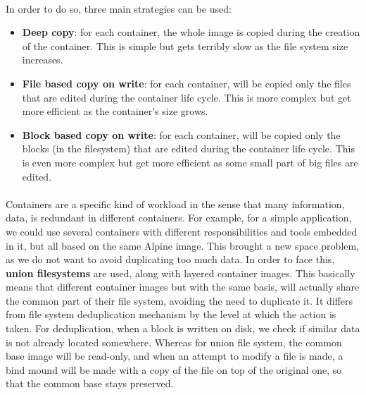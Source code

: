 \paragraph{}In order to do so, three main strategies can be used:
\begin{itemize}
\renewcommand\labelitemi{--}
  \item \textbf{Deep copy}: for each container, the whole image is copied during the creation of the container.  This is simple but gets terribly slow as the file system size increases.
  \item \textbf{File based copy on write}: for each container, will be copied only the files that are edited during the container life cycle.  This is more complex but get more efficient as the container's size grows.
  \item \textbf{Block based copy on write}: for each container, will be copied only the blocks (in the filesystem) that are edited during the container life cycle.  This is even more complex but get more efficient as some small part of big files are edited.
\end{itemize}

\paragraph{}Containers are a specific kind of workload in the sense that many information, data, is redundant in different containers.  For example, for a simple application, we could use several containers with different responsibilities and tools embedded in it, but all based on the same Alpine image.  This brought a new space problem, as we do not want to avoid duplicating too much data.  In order to face this, \textbf{union filesystems} are used, along with layered container images.  This basically means that different container images but with the same basis, will actually share the common part of their file system, avoiding the need to duplicate it.  It differs from file system deduplication mechanism by the level at which the action is taken.  For deduplication, when a block is written on disk, we check if similar data is not already located somewhere.  Whereas for union file system, the common base image will be read-only, and when an attempt to modify a file is made, a bind mound will be made with a copy of the file on top of the original one, so that the common base stays preserved.

